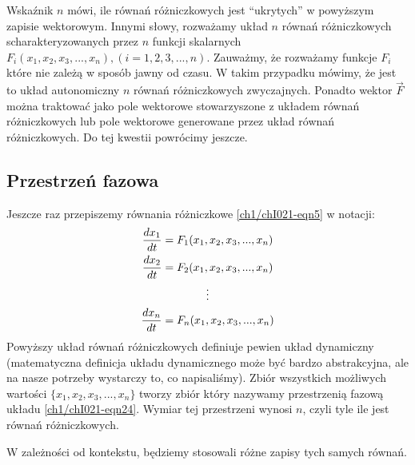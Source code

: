 \documentclass[a4paper,12pt,polish]{sphinxmanual}
\begin{document}
Wskaźnik $n$ mówi, ile równań różniczkowych jest ``ukrytych'' w powyższym zapisie wektorowym. Innymi słowy, rozważamy układ $n$ równań różniczkowych scharakteryzowanych przez $n$ funkcji skalarnych $F_i(x_1, x_2, x_3, ..., x_n), (i=1,2,3, ..., n)$. Zauważmy, że rozważamy funkcje $F_i$ które nie zależą w sposób jawny od czasu. W takim przypadku mówimy, że jest to układ autonomiczny $n$ równań  różniczkowych zwyczajnych. Ponadto wektor $\vec F$ można traktować jako pole wektorowe stowarzyszone z układem równań różniczkowych lub pole wektorowe generowane przez układ równań różniczkowych. Do tej kwestii powrócimy jeszcze.


\subsection{Przestrzeń fazowa}
\label{ch1/chI021:przestrzen-fazowa}
Jeszcze raz przepiszemy równania różniczkowe   \eqref{ch1/chI021-eqn5}  w  notacji:
\label{ch1/chI021:equation-eqn21}\begin{gather}
\begin{split}\frac{dx_1}{dt} = F_1(x_1, x_2, x_3, ..., x_n)\end{split}\label{ch1/chI021-eqn21}\\\begin{split}\frac{dx_2}{dt} = F_2(x_1, x_2, x_3, ..., x_n)\end{split}\notag\\\begin{split}\vdots\end{split}\notag\\\begin{split}\frac{dx_n}{dt} = F_n(x_1, x_2, x_3, ..., x_n)\end{split}\notag
\end{gather}
Powyższy układ równań różniczkowych  definiuje pewien układ dynamiczny (matematyczna definicja układu dynamicznego może być bardzo abstrakcyjna, ale na nasze potrzeby wystarczy to, co napisaliśmy).  Zbiór wszystkich możliwych wartości $\{x_1, x_2, x_3, ..., x_n\}$ tworzy zbiór który nazywamy przestrzenią fazową układu \eqref{ch1/chI021-eqn24}. Wymiar tej przestrzeni wynosi $n$, czyli tyle ile jest równań różniczkowych.

W zależności od kontekstu, będziemy stosowali różne zapisy tych samych równań.
\end{document}
